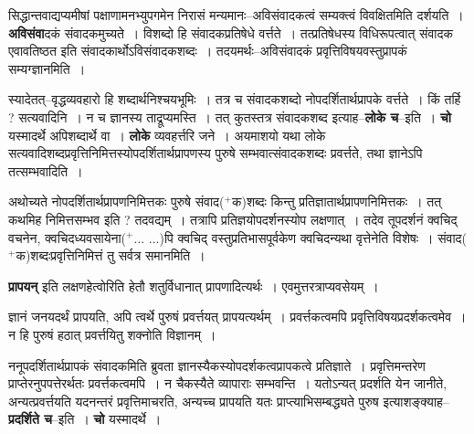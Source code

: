 \documentclass[article,12pt,a4paper]{memoir}
\newcommand{\add}[1]{($^{+}$#1)}
\begin{document}
	  \pstart सिद्धान्तवाद्यप्यमीषां पक्षाणामनभ्युपगमेन निरासं मन्यमानः--अविसंवादकत्वं सम्यक्त्वं विवक्षितमिति \leavevmode{} दर्शयति । \textbf{अविसंवा}दकं संवादकमुच्यते । विशब्दो हि संवादकप्रतिषेधे वर्त्तते । तत्प्रतिषेधस्य विधिरूपत्वात् संवादक एवावतिष्ठत इति संवादकार्थोऽविसंवादकशब्दः । तदयमर्थः--अविसंवादकं प्रवृत्तिविषयवस्तुप्रापकं सम्यग्ज्ञानमिति ।
	\pend
      

	  \pstart स्यादेतत्--वृद्धव्यवहारो हि शब्दार्थनिश्चयभूमिः । तत्र च संवादकशब्दो नोपदर्शितार्थप्रापके वर्त्तते । किं तर्हि ? सत्यवादिनि । न च ज्ञानस्य ताद्रूप्यमस्ति । तत् कुतस्तत्र संवादकशब्द इत्याह--\textbf{लोके च}--इति । \textbf{चो} यस्मादर्थे अपिशब्दार्थे वा । \textbf{लोके} व्यवहर्त्तरि जने । अयमाशयो यथा लोके सत्यवादिशब्दप्रवृत्तिनिमित्तस्योपदर्शितार्थप्रापणस्य पुरुषे सम्भवात्संवादकशब्दः प्रवर्त्तते, तथा ज्ञानेऽपि तत्सम्भवादिति ।
	\pend
      

	  \pstart अथोच्यते नोपदर्शितार्थप्रापणनिमित्तकः पुरुषे संवाद\add{क}शब्दः किन्तु प्रतिज्ञातार्थप्रापणनिमित्तकः । तत् कथमिह निमित्तसम्भव इति ? तदवद्यम् । तत्रापि प्रतिज्ञयोपदर्शनस्योप लक्षणात् । तदेव तूपदर्शनं क्वचिद् वचनेन, क्वचिदध्यवसायेना\add{... ...}पि क्वचिद् वस्तुप्रतिभासपूर्वकेण क्वचिदन्यथा वृत्तेनेति विशेषः । संवाद\add{क}शब्दःप्रवृत्तिनिमित्तं तु सर्वत्र समानमिति ।
	\pend
      

	  \pstart \textbf{प्रापयन्} इति लक्षणहेत्वोरिति हेतौ शतुर्विधानात् प्रापणादित्यर्थः । एवमुत्तरत्राप्यवसेयम् ।
	\pend
	  \bigskip
	  \begingroup
	

	  \pstart ज्ञानं जनयदर्थं प्रापयति, अपि त्वर्थे पुरुषं प्रवर्त्तयत् प्रापयत्यर्थम् । प्रवर्त्तकत्वमपि प्रवृत्तिविषयप्रदर्शकत्वमेव । न हि पुरुषं हठात् प्रवर्त्तयितु शक्नोति विज्ञानम् ।
	\pend
      
	  \endgroup
	

	  \pstart ननूपदर्शितार्थप्रापकं संवादकमिति ब्रुवता ज्ञानस्यैकस्योपदर्शकत्वप्रापकत्वे प्रतिज्ञाते । प्रवृत्तिमन्तरेण प्राप्तेरनुपपत्तेरर्थतः प्रवर्त्तकत्वमपि । न चैकस्यैते व्यापाराः सम्भवन्ति । यतोऽन्यत् प्रदर्शति येन जानीते, अन्यत्प्रवर्त्तयति यदनन्तरं प्रवृत्तिमाचरति, अन्यच्च प्रापयति यतः प्राप्त्याभिसम्बद्ध्यते पुरुष इत्याशङ्क्याह--\textbf{प्रदर्शिते च}--इति । \textbf{चो} यस्मादर्थे ।
	\pend
      
\end{document}
